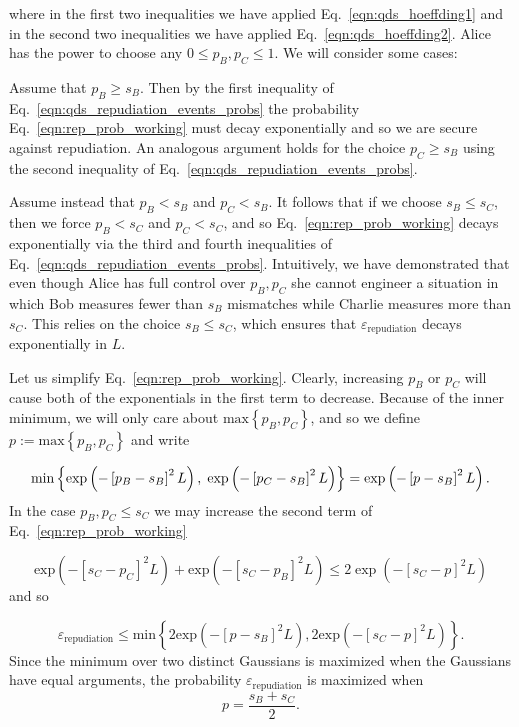 \noindent where in the first two inequalities we have applied Eq.~\ref{eqn:qds_hoeffding1} and in the second two inequalities we have applied Eq.~\ref{eqn:qds_hoeffding2}. Alice has the power to choose any $0 \le p_B, p_C \le 1$. We will consider some cases:

Assume that $p_B \ge s_B$. Then by the first inequality of Eq.~\ref{eqn:qds_repudiation_events_probs} the probability Eq.~\ref{eqn:rep_prob_working} must decay exponentially %
and so we are secure against repudiation. An analogous argument holds for the choice $p_C \ge s_B$ using the second inequality of Eq.~\ref{eqn:qds_repudiation_events_probs}.

Assume instead that $p_B < s_B$ and $p_C < s_B$. It follows that if we choose $s_B \le s_C$, then we force $p_B < s_C$ and $p_C < s_C$, and so Eq.~\ref{eqn:rep_prob_working} decays exponentially via the third and fourth inequalities of Eq.~\ref{eqn:qds_repudiation_events_probs}. Intuitively, we have demonstrated that even though Alice has full control over $p_B, p_C$ she cannot engineer a situation in which Bob measures fewer than $s_B$ mismatches while Charlie measures more than $s_C$. This relies on the choice $s_B \le s_C$, which ensures that $\varepsilon_{\text{repudiation}}$ decays exponentially in $L$.


Let us simplify Eq.~\ref{eqn:rep_prob_working}. Clearly, increasing $p_B$ or $p_C$ will cause both of the exponentials in the first term to decrease. Because of the inner minimum, we will only care about $\text{max}\left\{p_B, p_C\right\}$, and so we define $p := \text{max}\left\{p_B, p_C\right\}$ and write

\begin{equation}
\text{min}\left\{\text{exp}\left(- \left[p_B - s_B\right]^2L\right), \; \text{exp}\left(- \left[p_C - s_B\right]^2L\right)\right\} = \text{exp}\left(-\left[p - s_B\right]^2L\right). \notag
\end{equation}
In the case $p_B, p_C \le s_C$ we may increase the second term of Eq.~\ref{eqn:rep_prob_working} 

\begin{equation}
\text{exp}\left(- \left[s_C - p_C\right]^2 L \right) + \text{exp}\left(- \left[s_C - p_B\right]^2 L \right) \le 2 \exp\left( - \left[s_C - p\right]^2 L\right)
\end{equation}
and so

\begin{equation}
\varepsilon_{\text{repudiation}} \le \text{min}\left\{ 2 \text{exp}\left( - \left[p - s_B\right]^2 L \right), 2 \text{exp}\left( - \left[s_C - p\right]^2 L \right) \right\}.
\end{equation}
Since the minimum over two distinct Gaussians is maximized when the Gaussians have equal arguments, the probability $\varepsilon_{\text{repudiation}}$ is maximized when 
\begin{equation}
p = \frac{s_B + s_C}{2}.
\end{equation}

